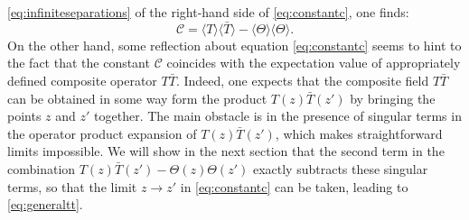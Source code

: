   \eqref{eq:infiniteseparations} of the right-hand side of
  \eqref{eq:constantc}, one finds:
  \begin{equation}
    \mathcal{C} = \langle T\rangle \langle \bar{T}\rangle - \langle
    \Theta\rangle \langle \Theta\rangle.
  \end{equation}
  On the other hand, some reflection about equation \eqref{eq:constantc} seems
  to hint to the fact that the constant $\mathcal{C}$ coincides with the
  expectation value of appropriately defined composite operator $T\bar{T}$.
  Indeed, one expects that the composite field $T\bar{T}$ can be obtained 
  in some way form the product $T(z)\bar{T}(z')$ by bringing the points 
  $z$ and $z'$ together. The main obstacle is in the presence of singular
  terms in the operator product expansion of $T(z)\bar{T}(z')$, which makes
  straightforward limits impossible. We will show in the next section that the
  second term in the combination $T(z)\bar{T}(z') - \Theta(z)\Theta(z')$
  exactly subtracts these singular terms, so that the limit $z\rightarrow z'$
  in \eqref{eq:constantc} can be taken, leading to \eqref{eq:generaltt}.
